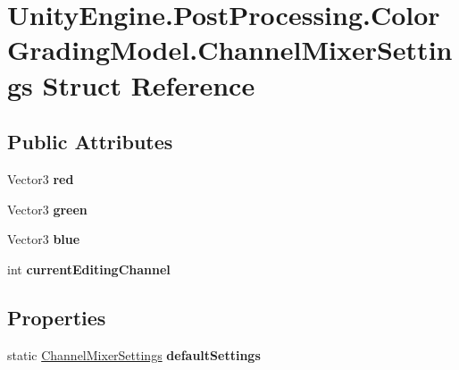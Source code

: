 \hypertarget{struct_unity_engine_1_1_post_processing_1_1_color_grading_model_1_1_channel_mixer_settings}{}\section{Unity\+Engine.\+Post\+Processing.\+Color\+Grading\+Model.\+Channel\+Mixer\+Settings Struct Reference}
\label{struct_unity_engine_1_1_post_processing_1_1_color_grading_model_1_1_channel_mixer_settings}
\subsection*{Public Attributes}
\begin{DoxyCompactItemize}
\item 
\mbox{\label{struct_unity_engine_1_1_post_processing_1_1_color_grading_model_1_1_channel_mixer_settings_a6d3b0a112b49bce65c7d446d51ef979e}} 
Vector3 {\bfseries red}
\item 
\mbox{\label{struct_unity_engine_1_1_post_processing_1_1_color_grading_model_1_1_channel_mixer_settings_a12e1143ea697393dcd4654928337c614}} 
Vector3 {\bfseries green}
\item 
\mbox{\label{struct_unity_engine_1_1_post_processing_1_1_color_grading_model_1_1_channel_mixer_settings_a214cd1df255d947d655f12edcc4b1f50}} 
Vector3 {\bfseries blue}
\item 
\mbox{\label{struct_unity_engine_1_1_post_processing_1_1_color_grading_model_1_1_channel_mixer_settings_a597fd37dc19eb835337e0a47bd4484b6}} 
int {\bfseries current\+Editing\+Channel}
\end{DoxyCompactItemize}
\subsection*{Properties}
\begin{DoxyCompactItemize}
\item 
\mbox{\label{struct_unity_engine_1_1_post_processing_1_1_color_grading_model_1_1_channel_mixer_settings_ae6c4d9717f045356da630f9a3d75b78d}} 
static \mbox{\hyperlink{struct_unity_engine_1_1_post_processing_1_1_color_grading_model_1_1_channel_mixer_settings}{Channel\+Mixer\+Settings}} {\bfseries default\+Settings}
\end{DoxyCompactItemize}


